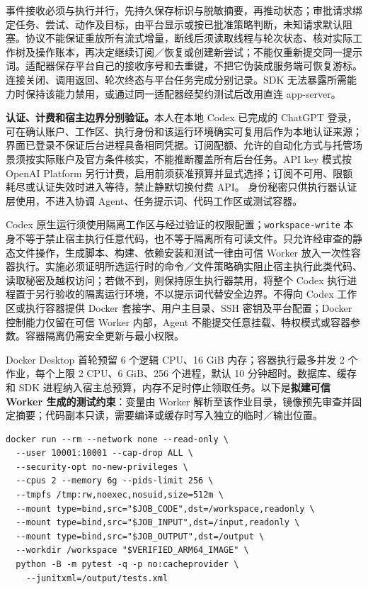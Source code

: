 \documentclass[11pt,a4paper]{article}
\begin{document}
事件接收必须与执行并行，先持久保存标识与脱敏摘要，再推动状态；审批请求绑定任务、尝试、动作及目标，由平台显示或按已批准策略判断，未知请求默认阻塞。协议不能保证重放所有流式增量，断线后须读取线程与轮次状态、核对实际工作树及操作账本，再决定继续订阅／恢复或创建新尝试；不能仅重新提交同一提示词。适配器保存平台自己的接收序号和去重键，不把它伪装成服务端可恢复游标。连接关闭、调用返回、轮次终态与平台任务完成分别记录。SDK 无法暴露所需能力时保持该能力禁用，或通过同一适配器经契约测试后改用直连 app-server。

\textbf{认证、计费和宿主边界分别验证。}本人在本地 Codex 已完成的 ChatGPT 登录，可在确认账户、工作区、执行身份和该运行环境确实可复用后作为本地认证来源；界面已登录不保证后台进程具备相同凭据。订阅配额、允许的自动化方式与托管场景须按实际账户及官方条件核实，不能推断覆盖所有后台任务。API key 模式按 OpenAI Platform 另行计费，启用前须获准预算并显式选择；订阅不可用、限额耗尽或认证失效时进入等待，禁止静默切换付费 API。\cite{v121-codex-auth} 身份秘密只供执行器认证层使用，不进入协调 Agent、任务提示词、代码工作区或测试容器。

Codex 原生运行须使用隔离工作区与经过验证的权限配置；\texttt{workspace-write} 本身不等于禁止宿主执行任意代码，也不等于隔离所有可读文件。只允许经审查的静态文件操作，生成脚本、构建、依赖安装和测试一律由可信 Worker 放入一次性容器执行。实施必须证明所选运行时的命令／文件策略确实阻止宿主执行此类代码、读取秘密及越权访问；若做不到，则保持原生执行器禁用，将整个 Codex 执行进程置于另行验收的隔离运行环境，不以提示词代替安全边界。不得向 Codex 工作区或执行容器提供 Docker 套接字、用户主目录、SSH 密钥及平台配置；Docker 控制能力仅留在可信 Worker 内部，Agent 不能提交任意挂载、特权模式或容器参数。容器隔离仍需安全更新与最小权限。\cite{ops-docker-security}

Docker Desktop 首轮预留 6 个逻辑 CPU、16 GiB 内存；容器执行最多并发 2 个作业，每个上限 2 CPU、6 GiB、256 个进程，默认 10 分钟超时。数据库、缓存和 SDK 进程纳入宿主总预算，内存不足时停止领取任务。以下是\textbf{拟建可信 Worker 生成的测试约束}：变量由 Worker 解析至该作业目录，镜像预先审查并固定摘要；代码副本只读，需要编译或缓存时写入独立的临时／输出位置。

\par\noindent\begin{minipage}{\linewidth}
\begin{lstlisting}
docker run --rm --network none --read-only \
  --user 10001:10001 --cap-drop ALL \
  --security-opt no-new-privileges \
  --cpus 2 --memory 6g --pids-limit 256 \
  --tmpfs /tmp:rw,noexec,nosuid,size=512m \
  --mount type=bind,src="$JOB_CODE",dst=/workspace,readonly \
  --mount type=bind,src="$JOB_INPUT",dst=/input,readonly \
  --mount type=bind,src="$JOB_OUTPUT",dst=/output \
  --workdir /workspace "$VERIFIED_ARM64_IMAGE" \
  python -B -m pytest -q -p no:cacheprovider \
    --junitxml=/output/tests.xml
\end{lstlisting}
\end{minipage}\par
\end{document}
